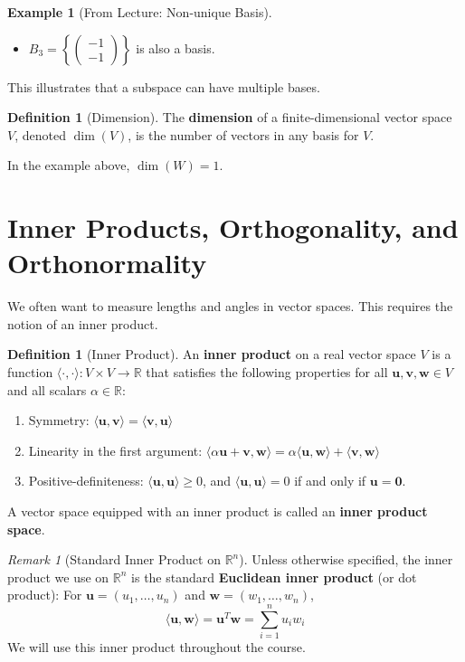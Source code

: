 \documentclass[11pt]{article}
\theoremstyle{definition}
\newtheorem{definition}[theorem]{Definition}
\newtheorem{example}[theorem]{Example}
\theoremstyle{remark}
\newtheorem{remark}[theorem]{Remark}
\newcommand{\R}{\mathbb{R}}
\newcommand{\dimn}{\operatorname{dim}}
\newcommand{\inner}[2]{\langle #1, #2 \rangle}
\newcommand{\trans}{^T} %
\begin{document}
\begin{example}[From Lecture: Non-unique Basis]
\begin{itemize}
\begin{itemize}
            \item $B_3 = \left\{ \begin{pmatrix} -1 \\ -1 \end{pmatrix} \right\}$ is also a basis.
        \end{itemize}
    This illustrates that a subspace can have multiple bases.
\end{itemize}
\end{example}

\begin{definition}[Dimension]
The \textbf{dimension} of a finite-dimensional vector space $V$, denoted $\dimn(V)$, is the number of vectors in any basis for $V$.
\end{definition}
In the example above, $\dimn(W) = 1$.

\section{Inner Products, Orthogonality, and Orthonormality}

We often want to measure lengths and angles in vector spaces. This requires the notion of an inner product.

\begin{definition}[Inner Product]
An \textbf{inner product} on a real vector space $V$ is a function $\inner{\cdot}{\cdot}: V \times V \to \R$ that satisfies the following properties for all $\mathbf{u}, \mathbf{v}, \mathbf{w} \in V$ and all scalars $\alpha \in \R$:
\begin{enumerate}
    \item Symmetry: $\inner{\mathbf{u}}{\mathbf{v}} = \inner{\mathbf{v}}{\mathbf{u}}$
    \item Linearity in the first argument: $\inner{\alpha \mathbf{u} + \mathbf{v}}{\mathbf{w}} = \alpha \inner{\mathbf{u}}{\mathbf{w}} + \inner{\mathbf{v}}{\mathbf{w}}$
    \item Positive-definiteness: $\inner{\mathbf{u}}{\mathbf{u}} \ge 0$, and $\inner{\mathbf{u}}{\mathbf{u}} = 0$ if and only if $\mathbf{u} = \mathbf{0}$.
\end{enumerate}
A vector space equipped with an inner product is called an \textbf{inner product space}.
\end{definition}

\begin{remark}[Standard Inner Product on $\R^n$]
Unless otherwise specified, the inner product we use on $\R^n$ is the standard \textbf{Euclidean inner product} (or dot product):
For $\mathbf{u} = (u_1, \dots, u_n)$ and $\mathbf{w} = (w_1, \dots, w_n)$,
\[ \inner{\mathbf{u}}{\mathbf{w}} = \mathbf{u}\trans \mathbf{w} = \sum_{i=1}^n u_i w_i \]
We will use this inner product throughout the course.
\end{remark}
\end{document}
